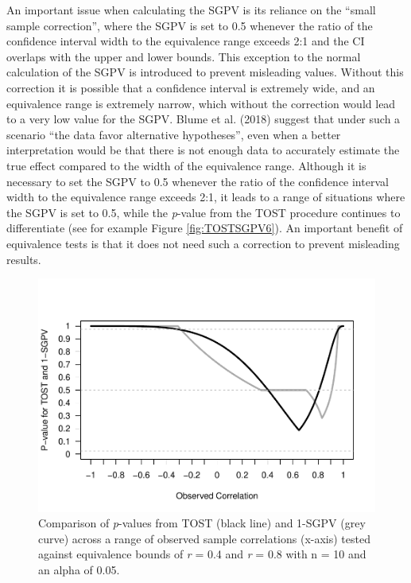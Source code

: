 \documentclass[,man,floatsintext]{apa6}
\begin{document}
An important issue when calculating the SGPV is its reliance on the \enquote{small sample correction}, where the SGPV is set to 0.5 whenever the ratio of the confidence interval width to the equivalence range exceeds 2:1 and the CI overlaps with the upper and lower bounds. This exception to the normal calculation of the SGPV is introduced to prevent misleading values. Without this correction it is possible that a confidence interval is extremely wide, and an equivalence range is extremely narrow, which without the correction would lead to a very low value for the SGPV. Blume et al. (2018) suggest that under such a scenario \enquote{the data favor alternative hypotheses}, even when a better interpretation would be that there is not enough data to accurately estimate the true effect compared to the width of the equivalence range. Although it is necessary to set the SGPV to 0.5 whenever the ratio of the confidence interval width to the equivalence range exceeds 2:1, it leads to a range of situations where the SGPV is set to 0.5, while the \emph{p}-value from the TOST procedure continues to differentiate (see for example Figure \ref{fig:TOSTSGPV6}). An important benefit of equivalence tests is that it does not need such a correction to prevent misleading results.

\begin{figure}
\centering
\includegraphics{manuscript.R2_files/figure-latex/TOSTSGPV13-1.pdf}
\caption{\label{fig:TOSTSGPV13}Comparison of \emph{p}-values from TOST (black line) and 1-SGPV (grey curve) across a range of observed sample correlations (x-axis) tested against equivalence bounds of \emph{r} = 0.4 and \emph{r} = 0.8 with n = 10 and an alpha of 0.05.}
\end{figure}
\end{document}
